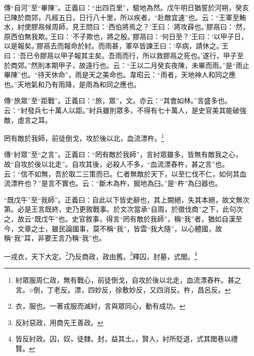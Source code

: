 {\noindent\zhuan{}\fzbyks 傳“自河”至“畢陳”。正義曰：“出四百里”，驗地為然。戊午明日猶誓於河朔，癸亥已陳於商郊，凡經五日，日行八十里，所以疾者，“赴敵宜速”也。云：“王軍至鮪水，紂使膠鬲候周師，見王問曰：‘西伯將焉之？’王曰：‘將攻薛也。’膠鬲曰：‘然，原西伯無我欺。’王曰：‘不子欺也，將之殷。’膠鬲曰：‘何日至？’王曰：‘以甲子日，以是報矣。’膠鬲去而報命於紂。而雨甚，軍卒皆諫王曰：‘卒病，請休之。’王曰：‘吾已令膠鬲以甲子報其主矣。吾雨而行，所以救膠鬲之死也。’遂行，甲子至於商郊。”然則本期甲子，故遠行也。云：“王以二月癸亥夜陳，未畢而雨。”是“雨止畢陳”也。“待天休命”，雨是天之美命也。韋昭云：“雨者，天地神人和同之應也。”天地氣和乃有雨降，是雨為和同之應也。 \par}

{\noindent\zhuan{}\fzbyks 傳“旅眾”至“距戰”。正義曰：“旅，眾”，文。亦云：“其會如林。”言盛多也。云：“紂發兵七十萬人以距。”紂兵雖則眾多，不得有七十萬人，是史官美其能破強敵，虛言之耳。 \par}

罔有敵於我師，前徒倒戈，攻於後以北，血流漂杵。\footnote{紂眾服周仁政，無有戰心，前徒倒戈，自攻於後以北走，血流漂舂杵。甚之言。○倒，丁老反。漂，四妙反，徐敷妙反，又四消反。杵，昌呂反。}

{\noindent\zhuan{}\fzbyks 傳“紂眾”至“之言”。正義曰：“罔有敵於我師”，言紂眾雖多，皆無有敵我之心，故“自攻於後以北走”。自攻其後，必殺人不多，“血流漂舂杵，甚之言”也。云：“信不如無，吾於取二三策而已。仁者無敵於天下，以至仁伐不仁，如何其血流漂杵也？”是言不實也。云：“斷木為杵，掘地為臼。”是“杵”為臼器也。 \par}

{\noindent\shu{}\fzkt “既戊午”至“我師”。正義曰：自此以下皆史辭也，其上闕絕，失其本絕，故文無次第。必是王言既終，史乃更敘戰事。於文次當承“自周，於徵伐商”之下，此句次之，故云“既戊午”也。史官敘事，得言“罔有敵於我師”，稱“我”者，猶如自漢至今，文章之士，雖民論國事，莫不稱“我”，皆雲“我大隨”，以心體國，故稱“我”耳，非要王言乃稱“我”也。 \par}

一戎衣，天下大定。\footnote{衣，服也。一著戎服而滅紂，言與眾同心，動有成功。}乃反商政，政由舊。\footnote{反紂惡政，用商先王善政。}釋囚，封墓，式閭。\footnote{皆反紂政。囚，奴，徒隸。封，益其土。，賢人，紂所貶退，式其閭巷以禮賢。}


